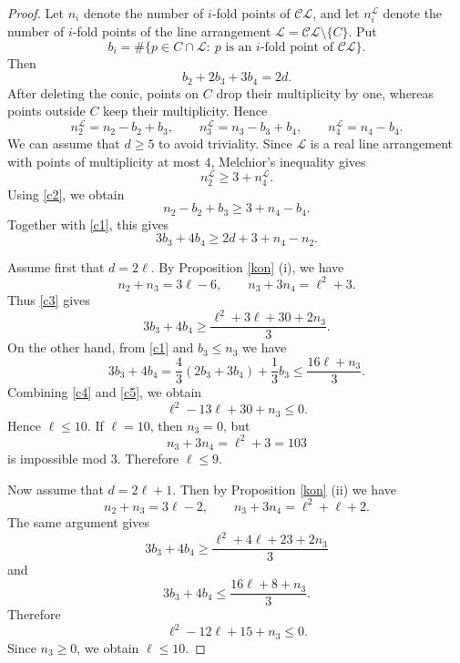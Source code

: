 \documentclass[11pt]{article}
\theoremstyle{plain}
\theoremstyle{definition}
\theoremstyle{remark}
\begin{document}
\begin{proof}
Let $n_i$ denote the number of $i$-fold points of $\mathcal{CL}$, and let
$n_i^{\mathcal{L}}$ denote the number of $i$-fold points of the line arrangement
$\mathcal{L}=\mathcal{CL}\setminus\{C\}$. Put
\[
b_i=\#\{p\in C\cap \mathcal{L}:\ p \text{ is an } i\text{-fold point of } \mathcal{CL}\}.
\]
Then
\begin{equation}
\label{c1}
b_2+2b_3+3b_4=2d. 
\end{equation}
After deleting the conic, points on $C$ drop their multiplicity by one, whereas
points outside $C$ keep their multiplicity. Hence
\begin{equation}
\label{c2}
n_2^{\mathcal{L}}=n_2-b_2+b_3,\qquad
n_3^{\mathcal{L}}=n_3-b_3+b_4,\qquad
n_4^{\mathcal{L}}=n_4-b_4. 
\end{equation}
We can assume that $d\geq 5$ to avoid triviality. Since $\mathcal{L}$ is a real line arrangement with points of multiplicity at most $4$,
Melchior's inequality \cite{Melchior} gives
\[
n_2^{\mathcal{L}}\geq 3+n_4^{\mathcal{L}}.
\]
Using \eqref{c2}, we obtain
\[
n_2-b_2+b_3\geq 3+n_4-b_4.
\]
Together with \eqref{c1}, this gives
\begin{equation}
\label{c3}
3b_3+4b_4\geq 2d+3+n_4-n_2.
\end{equation}

Assume first that $d=2\ell$. By Proposition \ref{kon} (i), we have
\[
n_2+n_3=3\ell-6,\qquad n_3+3n_4=\ell^2+3.
\]
Thus \eqref{c3} gives
\begin{equation}
\label{c4}
3b_3+4b_4
\geq
\frac{\ell^2+3\ell+30+2n_3}{3}.
\end{equation}
On the other hand, from \eqref{c1} and $b_3\leq n_3$ we have
\begin{equation}
\label{c5}
3b_3+4b_4
=
\frac43(2b_3+3b_4)+\frac13b_3
\leq
\frac{16\ell+n_3}{3}. 
\end{equation}
Combining \eqref{c4} and \eqref{c5}, we obtain
\[
\ell^2-13\ell+30+n_3\leq 0.
\]
Hence $\ell\leq 10$. If $\ell=10$, then $n_3=0$, but
\[
n_3+3n_4=\ell^2+3=103
\]
is impossible mod $3$. Therefore $\ell\leq 9$.

Now assume that $d=2\ell+1$. Then by Proposition \ref{kon} (ii) we have
\[
n_2+n_3=3\ell-2,\qquad n_3+3n_4=\ell^2+\ell+2.
\]
The same argument gives
\[
3b_3+4b_4
\geq
\frac{\ell^2+4\ell+23+2n_3}{3}
\]
and
\[
3b_3+4b_4
\leq
\frac{16\ell+8+n_3}{3}.
\]
Therefore
\[
\ell^2-12\ell+15+n_3\leq 0.
\]
Since $n_3\geq 0$, we obtain $\ell\leq 10$.
\end{proof}
\end{document}

